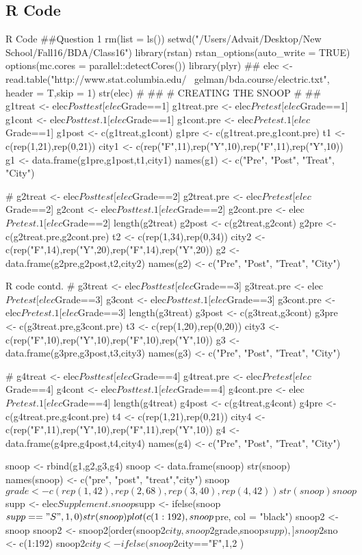 \documentclass{article}
\begin{document}
\subsection{R Code}
\begin{sexylisting}{R Code}
##Question 1
rm(list = ls())
setwd("/Users/Advait/Desktop/New School/Fall16/BDA/Class16")
library(rstan)
rstan_options(auto_write = TRUE)
options(mc.cores = parallel::detectCores())
library(plyr)
##
elec <- read.table("http://www.stat.columbia.edu/
~gelman/bda.course/electric.txt", header = T,skip  = 1)
str(elec)
# ##
# CREATING THE SNOOP
# ##
g1treat <- elec$Posttest[elec$Grade==1]
g1treat.pre <- elec$Pretest[elec$Grade==1]
g1cont <- elec$Posttest.1[elec$Grade==1]
g1cont.pre <- elec$Pretest.1[elec$Grade==1]
g1post <- c(g1treat,g1cont)
g1pre <- c(g1treat.pre,g1cont.pre)
t1 <- c(rep(1,21),rep(0,21))
city1 <- c(rep("F",11),rep("Y",10),rep("F",11),rep("Y",10))
g1 <- data.frame(g1pre,g1post,t1,city1)
names(g1) <- c("Pre", "Post", "Treat", "City")

#
g2treat <- elec$Posttest[elec$Grade==2]
g2treat.pre <- elec$Pretest[elec$Grade==2]
g2cont <- elec$Posttest.1[elec$Grade==2]
g2cont.pre <- elec$Pretest.1[elec$Grade==2]
length(g2treat)
g2post <- c(g2treat,g2cont)
g2pre <- c(g2treat.pre,g2cont.pre)
t2 <- c(rep(1,34),rep(0,34))
city2 <- c(rep("F",14),rep("Y",20),rep("F",14),rep("Y",20))
g2 <- data.frame(g2pre,g2post,t2,city2)
names(g2) <- c("Pre", "Post", "Treat", "City")
\end{sexylisting}
\begin{sexylisting}{R code contd.}
#
g3treat <- elec$Posttest[elec$Grade==3]
g3treat.pre <- elec$Pretest[elec$Grade==3]
g3cont <- elec$Posttest.1[elec$Grade==3]
g3cont.pre <- elec$Pretest.1[elec$Grade==3]
length(g3treat)
g3post <- c(g3treat,g3cont)
g3pre <- c(g3treat.pre,g3cont.pre)
t3 <- c(rep(1,20),rep(0,20))
city3 <- c(rep("F",10),rep("Y",10),rep("F",10),rep("Y",10))
g3 <- data.frame(g3pre,g3post,t3,city3)
names(g3) <- c("Pre", "Post", "Treat", "City")

#
g4treat <- elec$Posttest[elec$Grade==4]
g4treat.pre <- elec$Pretest[elec$Grade==4]
g4cont <- elec$Posttest.1[elec$Grade==4]
g4cont.pre <- elec$Pretest.1[elec$Grade==4]
length(g4treat)
g4post <- c(g4treat,g4cont)
g4pre <- c(g4treat.pre,g4cont.pre)
t4 <- c(rep(1,21),rep(0,21))
city4 <- c(rep("F",11),rep("Y",10),rep("F",11),rep("Y",10))
g4 <- data.frame(g4pre,g4post,t4,city4)
names(g4) <- c("Pre", "Post", "Treat", "City")

snoop <- rbind(g1,g2,g3,g4)
snoop <- data.frame(snoop)
str(snoop)
names(snoop) <- c("pre", "post", "treat","city")
snoop$grade <- c(rep(1,42),rep(2,68),rep(3,40), rep(4,42))
str(snoop)
snoop$supp <- elec$Supplement.
snoop$supp <- ifelse(snoop$supp=="S",1,0)
str(snoop)
plot(c(1:192),snoop$pre, col = "black")
snoop2 <- snoop
snoop2 <- snoop2[order(snoop2$city,
 snoop2$grade,snoop$supp),]
snoop2$sno <- c(1:192)
snoop2$city <- ifelse(snoop2$city=="F",1,2 )
\end{sexylisting}
\end{document}
